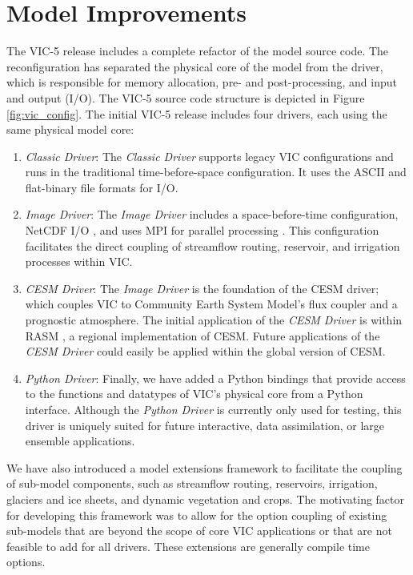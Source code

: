 \documentclass[gmd, manuscript]{copernicus}
\begin{document}
\section{Model Improvements}
  \label{sec:improvements}
  The VIC-5 release includes a complete refactor of the model source code.
  The reconfiguration has separated the physical core of the model from the driver, which is responsible for memory allocation, pre- and post-processing, and input and output (I/O).
  The VIC-5 source code structure is depicted in Figure \ref{fig:vic_config}.
  The initial VIC-5 release includes four drivers, each using the same physical model core:
  \begin{enumerate}
    \item \textit{Classic Driver}: The \textit{Classic Driver} supports legacy VIC configurations and runs in the traditional time-before-space configuration.
    It uses the ASCII and flat-binary file formats for I/O.
    \item \textit{Image Driver}: The \textit{Image Driver} includes a space-before-time configuration, NetCDF I/O \citep{Rew_1990}, and uses MPI for parallel processing \citep{Gropp_1996}.
    This configuration facilitates the direct coupling of streamflow routing, reservoir, and irrigation processes within VIC.
    \item \textit{CESM Driver}: The \textit{Image Driver} is the foundation of the CESM driver; which couples VIC to Community Earth System Model's \citep[CESM;][]{Hurrell_2013} flux coupler \citep[CPL7;][]{Craig_2012} and a prognostic atmosphere.
    The initial application of the \textit{CESM Driver} is within RASM \citep{Hamman_2016a}, a regional implementation of CESM.
    Future applications of the \textit{CESM Driver} could easily be applied within the global version of CESM.
    \item \textit{Python Driver}: Finally, we have added a Python bindings that provide access to the functions and datatypes of VIC’s physical core from a Python interface.
    Although the \textit{Python Driver} is currently only used for testing, this driver is uniquely suited for future interactive, data assimilation, or large ensemble applications.
  \end{enumerate}

  We have also introduced a model extensions framework to facilitate the coupling of sub-model components, such as streamflow routing, reservoirs, irrigation, glaciers and ice sheets, and dynamic vegetation and crops.
  The motivating factor for developing this framework was to allow for the option coupling of existing sub-models that are beyond the scope of core VIC applications or that are not feasible to add for all drivers.
  These extensions are generally compile time options.
\end{document}
